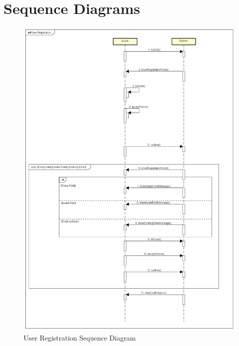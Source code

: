 \section{Sequence Diagrams}

\begin{figure}[H]
	\centering
	\includegraphics[width = \textwidth]{img/sequence1}
	\caption{User Registration Sequence Diagram}
\end{figure}

